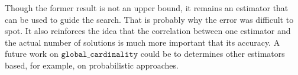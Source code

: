 \documentclass[jair,twoside,11pt,theapa]{article}
\begin{document}
 Though the former result is not an upper bound, it remains an estimator that can be used to guide the search. That is probably why the error was difficult to spot. It also reinforces the idea that the correlation between one estimator and the actual number of solutions is much more important that its accuracy. A future work on $\texttt{global\_cardinality}$ could be to determines other estimators based, for example, on probabilistic approaches.
 
 
 
 

 
 
\end{document}
